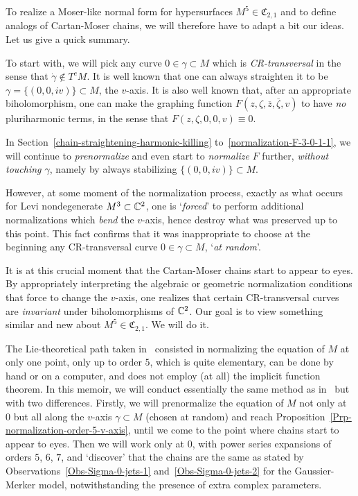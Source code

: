 \documentclass[12pt,twoside,leqno,openany]{amsart}
\begin{document}
To realize a Moser-like normal form for hypersurfaces 
$M^5 \in \mathfrak{C}_{2,1}$ and to define analogs
of Cartan-Moser chains, we will therefore have to adapt a bit
our ideas. Let us give a quick summary.

To start with, we will pick any curve
$0 \in \gamma \subset M$ 
which is {\sl CR-transversal} in the sense
that $\dot{\gamma} \not\in T^cM$.
It is well known that one can always straighten it
to be $\gamma = \{ (0, 0, iv) \} \subset M$, the $v$-axis. 
It is also well known that, after an appropriate 
biholomorphism, one can make the 
graphing function
$F(z, \zeta, \overline{z}, \overline{\zeta}, v)$
to have {\em no} pluriharmonic terms, in the sense 
that $F(z, \zeta, 0, 0, v) \equiv 0$.

In Section~{\ref{chain-straightening-harmonic-killing}} 
to~{\ref{normalization-F-3-0-1-1}}, 
we will continue to {\em prenormalize} and even
start to {\em normalize} $F$ 
further, {\em without touching $\gamma$}, namely
by always stabilizing $\{ (0, 0, iv) \} \subset M$.

However, at some moment of the normalization process,
exactly as what occurs~{\cite{Chern-Moser-1974,
Jacobowitz-1990}}
for Levi nondegenerate
$M^3 \subset \mathbb{C}^2$, one is `{\sl forced}' to 
perform additional normalizations which
{\em bend} the $v$-axis, hence destroy what was preserved
up to this point. This fact confirms
that it was inappropriate to choose
at the beginning any CR-transversal curve $0 \in \gamma \subset M$,
`{\sl at random}'. 

It is at this crucial moment that the Cartan-Moser chains
start to appear to eyes. By appropriately interpreting
the algebraic or geometric normalization conditions
that force to change the $v$-axis, one realizes that
certain CR-transversal curves are {\em invariant} 
under biholomorphisms of $\mathbb{C}^2$. Our goal is to 
view something similar and new about $M^5 \in \mathfrak{C}_{2,1}$.
We will do it.

The Lie-theoretical path taken in~{\cite{Merker-2020}}
consisted in normalizing the equation
of $M$ at only one point, only up to order $5$,
which is quite elementary, can be done by hand or on a computer,
and does not employ (at all) the implicit function theorem.
In this memoir, we will conduct essentially the same method
as in~{\cite{Merker-2020}} but with two differences.
Firstly, we will prenormalize the equation of $M$
not only at $0$ but all along the $v$-axis $\gamma \subset M$
(chosen at random) and reach
Proposition~{\ref{Prp-normalization-order-5-v-axis}}, 
until we come to the point where chains start to appear to eyes.
Then we will work only at $0$, with power series expansions
of orders $5$, $6$, $7$, and `discover' that the chains
are the same as stated by
Observations~{\ref{Obs-Sigma-0-jets-1}}
and~{\ref{Obs-Sigma-0-jets-2}} for the Gaussier-Merker model,
notwithstanding the presence of extra complex parameters.
\end{document}
